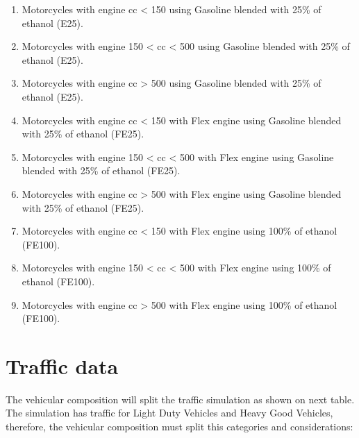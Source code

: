 \documentclass[12pt,graybox,envcountchap,sectrefs]{krantz}
\providecommand{\tightlist}{%
  \setlength{\itemsep}{0pt}\setlength{\parskip}{0pt}}
\theoremstyle{definition}
\theoremstyle{definition}
\theoremstyle{definition}
\theoremstyle{remark}
\begin{document}
\begin{enumerate}
\def\labelenumi{\arabic{enumi}.}
\tightlist
\item
  Motorcycles with engine cc \textless{} 150 using Gasoline blended with
  25\% of ethanol (E25).
\item
  Motorcycles with engine 150 \textless{} cc \textless{} 500 using
  Gasoline blended with 25\% of ethanol (E25).
\item
  Motorcycles with engine cc \textgreater{} 500 using Gasoline blended
  with 25\% of ethanol (E25).
\item
  Motorcycles with engine cc \textless{} 150 with Flex engine using
  Gasoline blended with 25\% of ethanol (FE25).
\item
  Motorcycles with engine 150 \textless{} cc \textless{} 500 with Flex
  engine using Gasoline blended with 25\% of ethanol (FE25).
\item
  Motorcycles with engine cc \textgreater{} 500 with Flex engine using
  Gasoline blended with 25\% of ethanol (FE25).
\item
  Motorcycles with engine cc \textless{} 150 with Flex engine using
  100\% of ethanol (FE100).
\item
  Motorcycles with engine 150 \textless{} cc \textless{} 500 with Flex
  engine using 100\% of ethanol (FE100).
\item
  Motorcycles with engine cc \textgreater{} 500 with Flex engine using
  100\% of ethanol (FE100).
\end{enumerate}

\section{Traffic data}\label{traffic-data}

The vehicular composition will split the traffic simulation as shown on
next table. The simulation has traffic for Light Duty Vehicles and Heavy
Good Vehicles, therefore, the vehicular composition must split this
categories and considerations:
\end{document}
